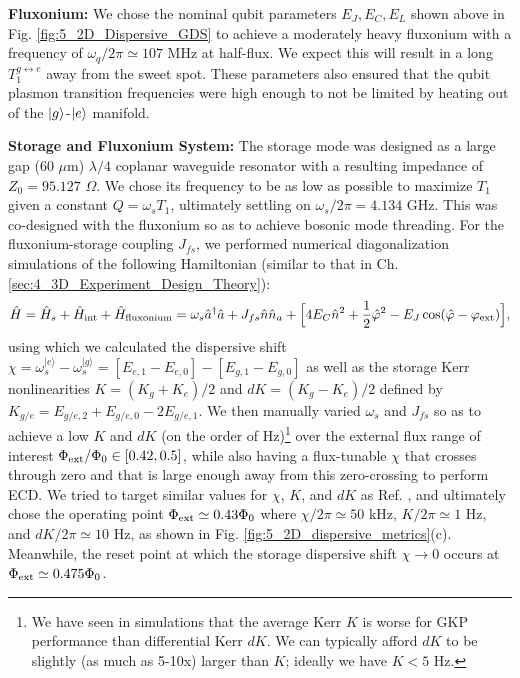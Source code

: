 \noindent \textbf{Fluxonium:} We chose the nominal qubit parameters $E_J, E_C, E_L$ shown above in Fig. \ref{fig:5_2D_Dispersive_GDS} to achieve a moderately heavy fluxonium with a frequency of $\omega_q/2\pi \simeq 107$ MHz at half-flux. We expect this will result in a long $T_1^{g\leftrightarrow e}$ away from the sweet spot. These parameters also ensured that the qubit plasmon transition frequencies were high enough to not be limited by heating out of the $\lvert g\rangle$-$\lvert e\rangle$ manifold. 


\noindent \textbf{Storage and Fluxonium System:} The storage mode was designed as a large gap (60 $\mu$m) $\lambda/4$ coplanar waveguide resonator with a resulting impedance of $Z_0 = 95.127$ $\Omega$. We chose its frequency to be as low as possible to maximize $T_1$ given a constant $Q = \omega_s T_1$, ultimately settling on $\omega_s/2\pi = 4.134$ GHz. This was co-designed with the fluxonium so as to achieve bosonic mode threading. For the fluxonium-storage coupling $J_{fs}$, we performed numerical diagonalization simulations of the following Hamiltonian (similar to that in Ch. \ref{sec:4_3D_Experiment_Design_Theory}):
\begin{equation}
    \hat{H} =  \hat{H}_s + \hat{H}_{\rm int} + \hat{H}_{\rm fluxonium} =  \omega_s \hat{a}^\dagger \hat{a} + J_{fs} \hat{n}\hat{n}_a + \Big[4E_C \hat{n}^2 + \frac{1}{2}\hat{\varphi}^2 - E_J\cos(\hat{\varphi}-\varphi_{\rm ext})\Big],
\end{equation}
using which we calculated the dispersive shift $\chi = \omega_s^{|e\rangle} - \omega_s^{|g\rangle} = [E_{e,1} - E_{e, 0}] - [E_{g, 1} - E_{g, 0}]$ as well as the storage Kerr nonlinearities $K = (K_g + K_e)/2$ and $dK = (K_g - K_e)/2$ defined by $K_{g/e} = E_{g/e, 2} + E_{g/e, 0} - 2E_{g/e, 1}$. We then manually varied $\omega_s$ and $J_{fs}$ so as to achieve a low $K$ and $dK$ (on the order of Hz)\footnote{We have seen in simulations that the average Kerr $K$ is worse for GKP performance than differential Kerr $dK$. We can typically afford $dK$ to be slightly (as much as 5-10x) larger than $K$; ideally we have $K < 5$ Hz.} over the external flux range of interest $\Phi_{\rm ext}/\Phi_0 \in [0.42, 0.5]$, while also having a flux-tunable $\chi$ that crosses through zero and that is large enough away from this zero-crossing to perform ECD. We tried to target similar values for $\chi$, $K$, and $dK$ as Ref. \cite{sivak2023gkp-expt}, and ultimately chose the operating point $\Phi_{\rm ext} \simeq 0.43\Phi_0$ where $\chi/2\pi \simeq 50$ kHz, $K/2\pi \simeq 1$ Hz, and $dK/2\pi \simeq 10$ Hz, as shown in Fig. \ref{fig:5_2D_dispersive_metrics}(c). Meanwhile, the reset point at which the storage dispersive shift $\chi \to 0$ occurs at $\Phi_{\rm ext} \simeq 0.475\Phi_0$. 

